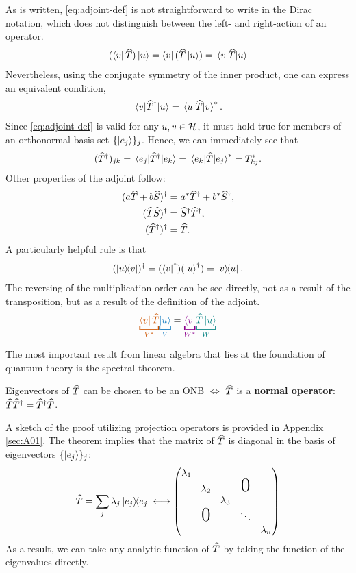 As is written, \eqref{eq:adjoint-def} is not straightforward to write in the Dirac notation, which does not distinguish between the left- and right-action of an operator. 
\begin{align}
	(\bra{v}\widehat{T})\ket{u} = \bra{v} (\widehat{T} \ket{u}) = \mel{v}{\widehat{T}}{u} 
\end{align}
Nevertheless, using the conjugate symmetry of the inner product, one can express an equivalent condition,
\begin{align}
	\mel{v}{\widehat{T}^{\dagger}}{u} =\mel{u}{\widehat{T}}{v}^*.
\end{align}
Since \eqref{eq:adjoint-def} is valid for any $u,v\in\mathcal{H}$, it must hold true for members of an orthonormal basis set $\{\ket{e_j}\}_j$. Hence, we can immediately see that
\begin{align}
	(\widehat{T}^{\dagger})_{jk} = \mel{e_j}{\widehat{T}^{\dagger}}{e_k} = \mel{e_k}{\widehat{T}}{e_j}^* = T_{kj}^*.
\end{align} 
Other properties of the adjoint follow:
\begin{align}
	(a\widehat{T} + b\widehat{S})^{\dagger} &= a^* \widehat{T}^{\dagger} + b^* \widehat{S}^{\dagger}, \\
	(\widehat{T} \widehat{S})^{\dagger} &= \widehat{S}^{\dagger} \widehat{T}^{\dagger}, \\
	(\widehat{T}^{\dagger})^{\dagger} &= \widehat{T}.
\end{align}
A particularly helpful rule is that
\begin{align}
	(\dyad{u}{v})\dgg = (\bra v\dgg)(\ket u\dgg) = \dyad{v}{u}.
\end{align}
The reversing of the multiplication order can be see directly, not as a result of the transposition, but as a result of the definition of the adjoint.
\begin{align}
	{\color{maincolor}\underbracket{\bra v \op T}_{V^*}} {\color{eqcolor}\underbracket{\ket u}_{V}} = {\color{darkmagenta}\underbracket{\bra v}_{W^*}}  {\color{teal}\underbracket{\op T \ket u}_{W}}
\end{align}

The most important result from linear algebra that lies at the foundation of quantum theory is the spectral theorem.

\begin{theorem}\leavevmode
	
	Eigenvectors of $\widehat{T}$ can be chosen to be an ONB $\iff$ $\widehat{T}$ is a {\bf normal operator}: $\widehat{T} \widehat{T}^{\dagger} = \widehat{T}^{\dagger} \widehat{T}$.
\end{theorem}
\noindent A sketch of the proof utilizing projection operators is provided in Appendix \ref{sec:A01}. The theorem implies that the matrix of $\widehat{T}$ is diagonal in the basis of eigenvectors $\{\ket{e_j}\}_j$:
\begin{align}
	\op T = \sum_j \lambda_j \dyad{e_j} \longleftrightarrow \mqty(\lambda_1&&&&
\\&\lambda_2&&\text{\huge0}&\\&&\lambda_3&&\\&\text{\huge0}&&\ddots&\\&&&&\lambda_n)
\end{align}
As a result, we can take any analytic function of $\widehat{T}$ by taking the function of the eigenvalues directly. 

